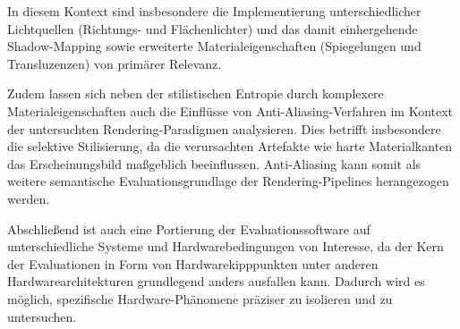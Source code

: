In diesem Kontext sind insbesondere die Implementierung unterschiedlicher Lichtquellen (Richtungs- und Flächenlichter)
und das damit einhergehende Shadow-Mapping sowie erweiterte Materialeigenschaften (Spiegelungen und Transluzenzen) von
primärer Relevanz.

Zudem lassen sich neben der stilistischen Entropie durch komplexere Materialeigenschaften auch die Einflüsse von
Anti-Aliasing-Verfahren im Kontext der untersuchten Rendering-Paradigmen analysieren.
Dies betrifft insbesondere die selektive Stilisierung, da die verursachten Artefakte wie harte Materialkanten das
Erscheinungsbild maßgeblich beeinflussen.
Anti-Aliasing kann somit als weitere semantische Evaluationsgrundlage der Rendering-Pipelines herangezogen werden.

Abschließend ist auch eine Portierung der Evaluationssoftware auf unterschiedliche Systeme und Hardwarebedingungen von
Interesse, da der Kern der Evaluationen in Form von Hardwarekipppunkten unter anderen Hardwarearchitekturen grundlegend
anders ausfallen kann.
Dadurch wird es möglich, spezifische Hardware-Phänomene präziser zu isolieren und zu untersuchen.

